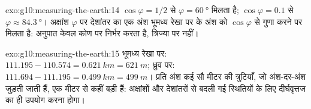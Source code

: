 \begin{solution}{exo:g10:measuring-the-earth:14}
$\cos\varphi = 1/2$ से $\varphi = \qty{60}{\degree}$ मिलता है; $\cos\varphi = 0.1$
से $\varphi \approx \qty{84.3}{\degree}$। अक्षांश $\varphi$ पर देशांतर का एक
अंश भूमध्य रेखा पर के अंश को $\cos\varphi$ से गुणा करने पर मिलता है:
अनुपात केवल कोण पर निर्भर करता है, त्रिज्या पर नहीं।
\end{solution}

\begin{solution}{exo:g10:measuring-the-earth:15}
भूमध्य रेखा पर: $111.195 - 110.574 = \qty{0.621}{km} = \qty{621}{m}$; ध्रुव
पर: $111.694 - 111.195 = \qty{0.499}{km} = \qty{499}{m}$। प्रति अंश कई सौ मीटर की
त्रुटियाँ, जो अंश-दर-अंश जुड़ती जाती हैं, एक मीटर से कहीं बड़ी हैं: अक्षांशों और देशांतरों
से बदली गई स्थितियों के लिए दीर्घवृत्तज का ही उपयोग करना होगा।
\end{solution}

